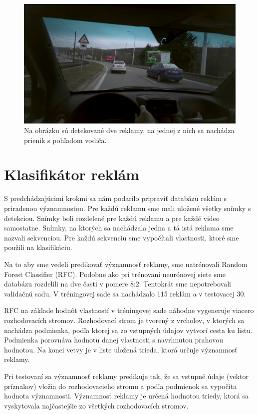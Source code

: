  \begin{figure}[ht]
     \centering
     \includegraphics[width=1\textwidth]{images/04/iou.jpg}
     \caption{Na obrázku sú detekované dve reklamy, na jednej z nich sa nachádza prienik s pohľadom vodiča.}
     \label{img:tracking}
 \end{figure}

\section{Klasifikátor reklám}

S predchádzajúcimi krokmi sa nám podarilo pripraviť databázu reklám s priradenou významnosťou. Pre každú reklamu sme mali uložené všetky snímky s detekciou. Snímky boli rozdelené pre každú reklamu a pre každé video samostatne. Snímky, na ktorých sa nachádzala jedna a tá istá reklama sme nazvali sekvenciou. Pre každú sekvenciu sme vypočítali vlastnosti, ktoré sme použili na klasifikáciu.

Na to aby sme vedeli predikovať významnosť reklamy, sme natrénovali Random Forest Classifier (RFC). Podobne ako pri trénovaní neurónovej siete sme databázu rozdelili na dve časti v pomere 8:2. Tentokrát sme nepotrebovali validačnú sadu. V tréningovej sade sa nachádzalo 115 reklám a v testovacej 30.

RFC na základe hodnôt vlastností v tréningovej sade náhodne vygeneruje viacero rozhodovacích stromov. Rozhodovací strom je tvorený z vrcholov, v ktorých sa nachádza podmienka, podľa ktorej sa zo vstupných údajov vytvorí cesta ku listu. Podmienka porovnáva hodnotu danej vlastnosti s navrhnutou prahovou hodnotou. Na konci vetvy je v liste uložená trieda, ktorá určuje významnosť reklamy.

Pri testovaní sa významnosť reklamy predikuje tak, že sa vstupné údaje (vektor príznakov) vložia do rozhodovacieho stromu a podľa podmienok sa vypočíta hodnota významnosti. Významnosť reklamy je určená hodnotou triedy, ktorá sa vyskytovala najčastejšie zo všetkých rozhodovacích stromov.

